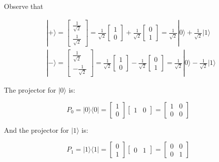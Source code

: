 \documentclass[main.tex]{subfiles}
\begin{document}
    Observe that
    
    $$
    \begin{aligned}
    &|+\rangle=\left[\begin{array}{l}
    \frac{1}{\sqrt{2}} \\
    \frac{1}{\sqrt{2}}
    \end{array}\right]=\frac{1}{\sqrt{2}}\left[\begin{array}{l}
    1 \\
    0
    \end{array}\right]+\frac{1}{\sqrt{2}}\left[\begin{array}{l}
    0 \\
    1
    \end{array}\right]=\frac{1}{\sqrt{2}}|0\rangle+\frac{1}{\sqrt{2}}|1\rangle \\
    &|-\rangle=\left[\begin{array}{r}
    \frac{1}{\sqrt{2}} \\
    -\frac{1}{\sqrt{2}}
    \end{array}\right]=\frac{1}{\sqrt{2}}\left[\begin{array}{l}
    1 \\
    0
    \end{array}\right]-\frac{1}{\sqrt{2}}\left[\begin{array}{l}
    0 \\
    1
    \end{array}\right]=\frac{1}{\sqrt{2}}|0\rangle-\frac{1}{\sqrt{2}}|1\rangle
    \end{aligned}
    $$
    
    The projector for $|0\rangle$ is:
    
    $$
    P_{0}=|0\rangle\langle 0|=\left[\begin{array}{l}
    1 \\
    0
    \end{array}\right]\left[\begin{array}{ll}
    1 & 0
    \end{array}\right]=\left[\begin{array}{ll}
    1 & 0 \\
    0 & 0
    \end{array}\right]
    $$
    
    And the projector for $|1\rangle$ is:
    
    $$
    P_{1}=|1\rangle\langle 1|=\left[\begin{array}{l}
    0 \\
    1
    \end{array}\right]\left[\begin{array}{ll}
    0 & 1
    \end{array}\right]=\left[\begin{array}{ll}
    0 & 0 \\
    0 & 1
    \end{array}\right]
    $$
    
\end{document}
